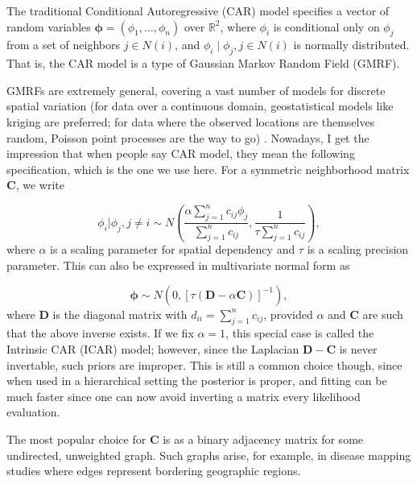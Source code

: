 \documentclass{scrartcl}
\newcommand{\R}{\mathbb{R}} %
\newcommand{\mat}[1]{\bm{#1}}
\begin{document}
The traditional Conditional Autoregressive (CAR) model specifies a
vector of random variables $\mat{\phi} = (\phi_1, \dots, \phi_n)$ over
$\R^2$, where $\phi_i$ is conditional only on $\phi_j$ from a set of neighbors
$j\in N(i)$, and $\phi_i \mid \phi_j, j\in N(i)$ is normally
distributed. That is, the CAR model is a type of Gaussian Markov
Random Field (GMRF).

GMRFs are extremely general, covering a vast number of models for
discrete spatial variation (for data over a continuous domain,
geostatistical models like kriging are preferred; for data where the
observed locations are themselves random, Poisson point processes are
the way to go) \cite{Gelfand2010}. Nowadays, I get the impression that when people say
CAR model, they mean the following specification, which is the one we
use here. For a symmetric neighborhood matrix $\mat{C}$, we write


\begin{equation}
  \label{eq:car1}
  \phi_i|\phi_j, j \neq i \sim N\left(\frac{\alpha \sum_{j=1}^nc_{ij}\phi_j}{\sum_{j = 1}^nc_{ij}}, \frac{1}{\tau \sum_{j = 1}^nc_{ij}}\right),
\end{equation}
where $\alpha$ is a scaling parameter for spatial dependency and
$\tau$ is a scaling precision parameter. This can
also be expressed in multivariate normal form as

\begin{equation}
  \label{eq:car2}
  \mat{\phi} \sim N(0, [\tau (\mat{D} - \alpha \mat{C})]^{-1}),
\end{equation}
where $\mat{D}$ is the diagonal matrix with
$d_{ii} = \sum_{j = 1}^nc_{ij}$, provided $\alpha$ and $\mat{C}$ are
such that the above inverse exists. If we fix $\alpha = 1$, this
special case is called the Intrinsic CAR (ICAR) model; however, since
the Laplacian $\mat{D} - \mat{C}$ is never invertable, such priors are
improper. This is still a common choice though, since when used in a
hierarchical setting the posterior is proper, and fitting can be much
faster since one can now avoid inverting a matrix every likelihood
evaluation.

The most popular choice for $\mat{C}$ is as a binary adjacency matrix
for some undirected, unweighted graph. Such graphs arise, for example,
in disease mapping studies where edges represent bordering geographic
regions.
\end{document}
